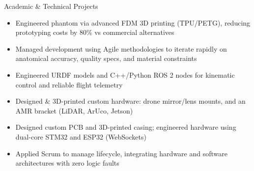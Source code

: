\documentclass{resume}
\begin{document}
\begin{experienceSection}{Academic \& Technical Projects}
    \projectItem[
        title={Open-Source Gastrointestinal Medical Phantom},
        duration={Ago-Dic 2025 – Feb-Jun 2026},
        keyHighlight={Agile, Advanced FDM}
    ]
    \begin{itemize}
        \vspace{-0.5em}
        \itemsep -6pt {}
        \item Engineered phantom via advanced FDM 3D printing (TPU/PETG), reducing prototyping costs by 80\% vs commercial alternatives
        \item Managed development using Agile methodologies to iterate rapidly on anatomical accuracy, quality specs, and material constraints
    \end{itemize}
    \projectItem[
        title={Port Automation \& Drone Sim},
        duration={Ago-Dic 2025},
        keyHighlight={ROS 2, Gazebo, C++, Python}
    ]
    \begin{itemize}
        \vspace{-0.5em}
        \itemsep -6pt {}
        \item Engineered URDF models and C++/Python ROS 2 nodes for kinematic control and reliable flight telemetry
        \item Designed \& 3D-printed custom hardware: drone mirror/lens mounts, and an AMR bracket (LiDAR, ArUco, Jetson)
    \end{itemize}
    \projectItem[
        title={DigiMix},
        duration={Ago-Dic 2024},
        keyHighlight={Embedded Systems, Scrum}
    ]
    \begin{itemize}
        \vspace{-0.5em}
        \itemsep -6pt {}
        \item Designed custom PCB and 3D-printed casing; engineered hardware using dual-core STM32 and ESP32 (WebSockets)
        \item Applied Scrum to manage lifecycle, integrating hardware and software architectures with zero logic faults
    \end{itemize}
\end{experienceSection}
\end{document}
